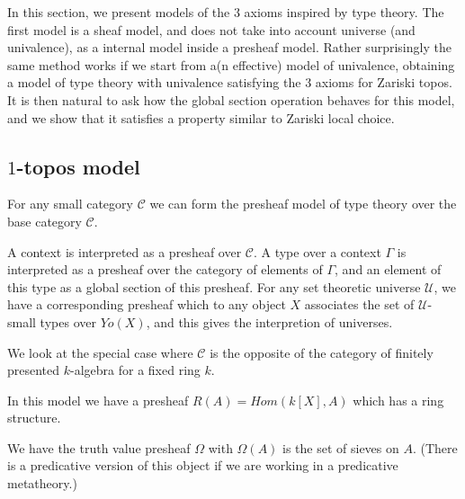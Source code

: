 

\newcommand{\inc}{\mathsf{inc}}
\newcommand{\inl}{\mathsf{inl}}
\newcommand{\inr}{\mathsf{inr}}
\newcommand{\II}{\mathbf{I}}
\newcommand\norm[1]{\left\lVert #1 \right\rVert}

\newcommand{\Gm}{\mathsf{G_m}}
\newcommand{\ext}{\mathsf{ext}}
\newcommand{\patch}{\mathsf{patch}}
\newcommand{\cov}{\mathsf{cov}}
\newcommand{\isSheaf}{\mathsf{isSheaf}}
\newcommand{\Fib}{\mathsf{Fib}}

\newcommand{\BB}{\mathcal{B}}
\newcommand{\CC}{\mathcal{C}}
\newcommand{\UU}{\mathcal{U}}

In this section, we present models of the 3 axioms inspired by type theory. The first model is a sheaf model, and does not
take into account universe (and univalence), as a internal model inside a presheaf model. Rather surprisingly the same method
works if we start from a(n effective) model of univalence, obtaining a model of type theory with univalence satisfying the
3 axioms for Zariski topos. It is then natural to ask how the global section operation behaves for this model, and we show that
it satisfies a property similar to Zariski local choice. 


\subsection{$1$-topos model}

For any small category $\CC$ we can form the presheaf model of type theory over the base category $\CC$.

A context is interpreted as a presheaf over $\CC$. A type over a context $\Gamma$ is interpreted as
a presheaf over the category of elements of $\Gamma$, and an element of this type as a global section
of this presheaf. For any set theoretic universe $\UU$, we have a corresponding presheaf which to
any object $X$ associates the set of $\UU$-small types over $Yo(X)$, and this gives the interpretion
of universes. 

\medskip

We look at the special case where $\CC$ is the opposite of the category of finitely presented $k$-algebra for a fixed
ring $k$.

    In this model we have a presheaf $R(A) = Hom(k[X],A)$ which has a ring structure.

    We have the truth value presheaf $\Omega$ with $\Omega(A)$ is the set of sieves on $A$.
    (There is a predicative version of this object if we are working in a predicative metatheory.)


